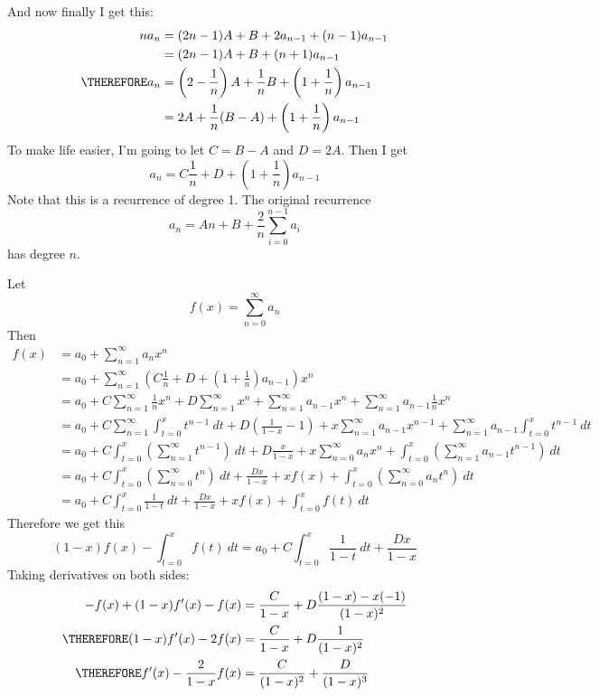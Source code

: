 And now finally I get this:
\begin{align*}
na_n 
&= (2n - 1) A + B + 2a_{n-1} + (n-1)a_{n-1} \\
&= (2n - 1) A + B + (n+1)a_{n-1} \\
\THEREFORE
a_n
&= \left(2 - \frac{1}{n}\right) A + \frac{1}{n}B +
   \left( 1 + \frac{1}{n} \right) a_{n-1}
   \\
&= 2A + \frac{1}{n}(B - A) +
   \left( 1 + \frac{1}{n} \right) a_{n-1}
\end{align*}
To make life easier, I'm going to let $C = B - A$ and $D = 2A$.
Then I get
\[
a_n
= C\frac{1}{n} + D
   + \left( 1 + \frac{1}{n} \right) a_{n-1}
\]
Note that this is a recurrence of degree 1.
The original recurrence
\[
a_n = An + B + \frac{2}{n} \sum_{i=0}^{n-1} a_i
\]
has degree $n$.

Let
\[
f(x) = \sum_{n = 0}^\infty a_n
\]
Then
\begin{align*}
f(x)
&= a_0 + \sum_{n = 1}^\infty a_n x^n \\
&= a_0 + \sum_{n = 1}^\infty
   \left( C\frac{1}{n} + D
   + \left( 1 + \frac{1}{n} \right) a_{n-1}\right) x^n
 \\
&= a_0
   + C \sum_{n=1}^\infty \frac{1}{n} x^n
   + D \sum_{n=1}^\infty  x^n
   + \sum_{n=1}^\infty a_{n-1} x^n
   + \sum_{n=1}^\infty a_{n-1} \frac{1}{n} x^n
   \\
&= a_0
   + C \sum_{n=1}^\infty \int_{t=0}^x t^{n-1} \ dt
   + D \left( \frac{1}{1-x} - 1 \right)
   + x \sum_{n=1}^\infty a_{n-1} x^{n-1}
   + \sum_{n=1}^\infty a_{n-1} \int_{t=0}^x t^{n-1} \ dt
   \\
&= a_0
   + C \int_{t=0}^x  \left( \sum_{n=1}^\infty t^{n-1} \right) \ dt
   + D \frac{x}{1-x}
   + x \sum_{n=0}^\infty a_n x^n
   +   \int_{t=0}^x \left(\sum_{n=1}^\infty  a_{n-1} t^{n-1}\right) \ dt
   \\
&= a_0
   + C \int_{t=0}^x  \left( \sum_{n=0}^\infty t^{n} \right) \ dt
   + \frac{Dx}{1-x}
   + x f(x)
   +   \int_{t=0}^x \left(\sum_{n=0}^\infty  a_{n} t^{n}\right) \ dt
   \\
&= a_0
   + C \int_{t=0}^x  \frac{1}{1-t} \ dt
   + \frac{Dx}{1-x}
   + x f(x)
   +  \int_{t=0}^x f(t) \ dt
\end{align*}
Therefore we get this
\[
(1-x)f(x) - \int_{t=0}^x f(t) \ dt
= a_0
   + C \int_{t=0}^x  \frac{1}{1-t} \ dt
   + \frac{Dx}{1-x}
\]
Taking derivatives on both sides:
\begin{align*}
  -f(x) + (1-x)f'(x) - f(x)
  &= \frac{C}{1-x} + D\frac{(1-x) - x(-1)}{(1-x)^2}\\
\THEREFORE (1 - x) f'(x) - 2 f(x) &= \frac{C}{1-x} + D\frac{1}{(1-x)^2}\\
\THEREFORE f'(x) - \frac{2}{1-x} f(x)
&= \frac{C}{(1-x)^2} 
+ \frac{D}{(1-x)^3}
\end{align*}

